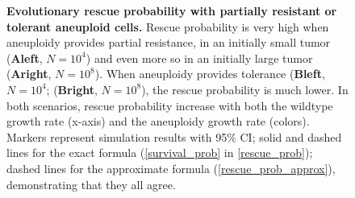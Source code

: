 \documentclass[12pt]{extarticle}
\begin{document}
\begin{figure}[p]
\begin{subfigure}{0.5\textwidth}
\end{subfigure}
\caption{
\textbf{Evolutionary rescue probability with partially resistant or tolerant aneuploid cells.}
Rescue probability is very high when aneuploidy provides partial resistance, in an initially small tumor (\textbf{Aleft}, $N=10^4$) and even more so in an initially large tumor (\textbf{Aright}, $N=10^8$). %
When aneuploidy provides tolerance (\textbf{Bleft}, $N=10^4$; (\textbf{Bright}, $N=10^8$), the rescue probability is much lower. 
In both scenarios, rescue probability increase with both the wildtype growth rate (x-axis) and the aneuploidy growth rate (colors).
Markers represent simulation results with 95\% CI; solid and dashed lines for the exact formula (\cref{survival_prob} in \cref{rescue_prob}); %
dashed lines for the approximate formula (\cref{rescue_prob_approx}), demonstrating that they all agree.
}
\label{rescue_prob_wt_growth}
\end{figure}
\end{document}
